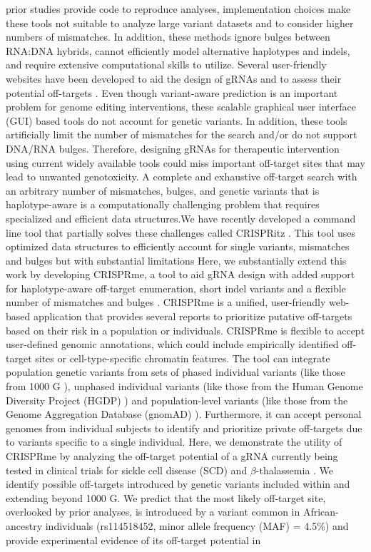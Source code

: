 \documentclass[a4paper, titlepage, openright]{book}
\newcommand{\crisprme}{CRISPRme\xspace}
\begin{document}
prior studies provide code to reproduce analyses, implementation choices make these tools not suitable to analyze large variant datasets and to consider higher numbers of mismatches. In addition, these methods ignore bulges between RNA:DNA hybrids, cannot efficiently model alternative haplotypes and indels, and require extensive computational skills to utilize. Several user-friendly websites have been developed to aid the design of gRNAs and to assess their potential off-targets \citep{concordet2018crispor, listgarten2018prediction, labun2019chopchop, park2015cas}. Even though variant-aware prediction is an important problem for genome editing interventions, these scalable graphical user interface (GUI) based tools do not account for genetic variants. In addition, these tools artificially limit the number of mismatches for the search and/or do not support DNA/RNA bulges. Therefore, designing gRNAs for therapeutic intervention using current widely available tools could miss important off-target sites that may lead to unwanted genotoxicity. A complete and exhaustive off-target search with an arbitrary number of mismatches, bulges, and genetic variants that is haplotype-aware is a computationally challenging problem that requires specialized and efficient data structures.We have recently developed a command line tool that partially solves these challenges called CRISPRitz \citep{cancellieri2020crispritz}. This tool uses optimized data structures to efficiently account for single variants, mismatches and bulges but with substantial limitations Here, we substantially extend this work by developing \crisprme, a tool to aid gRNA design with added support for haplotype-aware off-target enumeration, short indel variants and a flexible number of mismatches and bulges \citep{cancellieri2023human}. \crisprme is a unified, user-friendly web-based application that provides several reports to prioritize putative off-targets based on their risk in a population or individuals. \crisprme is flexible to accept user-defined genomic annotations, which could include empirically identified off-target sites or cell-type-specific chromatin features. The tool can integrate population genetic variants from sets of phased individual variants (like those from 1000 G \citep{lowy2019variant}), unphased individual variants (like those from the Human Genome Diversity Project (HGDP) \citep{bergstrom2020insights}) and population-level variants (like those from the Genome Aggregation Database (gnomAD) \citep{karczewski2020mutational}).  Furthermore, it can accept personal genomes from individual subjects to identify and prioritize private off-targets due to variants specific to a single individual. Here, we demonstrate the utility of \crisprme by analyzing the off-target potential of a gRNA currently being tested in clinical trials for sickle cell disease (SCD) and $\beta$-thalassemia \citep{frangoul2021crispr, canver2015bcl11a, wu2019highly}. We identify possible off-targets introduced by genetic variants included within and extending beyond 1000 G. We predict that the most likely off-target site, overlooked by prior analyses, is introduced by a variant common in African-ancestry individuals (rs114518452, minor allele frequency (MAF) = 4.5\%) and provide experimental evidence of its off-target potential in 
\end{document}
